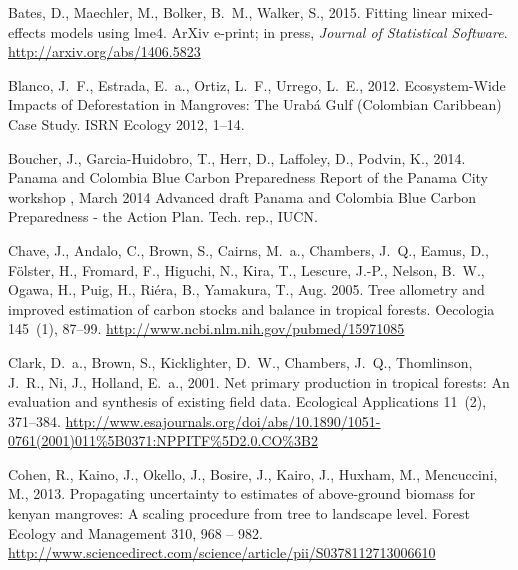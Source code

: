 \documentclass[review, authoryear]{elsarticle}   	%
\begin{document}
\begin{thebibliography}{51}
Bates, D., Maechler, M., Bolker, B.~M., Walker, S., 2015. Fitting linear
  mixed-effects models using {lme4}. ArXiv e-print; in press, \emph{Journal of
  Statistical Software}.
\newline\urlprefix\url{http://arxiv.org/abs/1406.5823}

Blanco, J.~F., Estrada, E.~a., Ortiz, L.~F., Urrego, L.~E., 2012.
  {Ecosystem-Wide Impacts of Deforestation in Mangroves: The Urab\'{a} Gulf
  (Colombian Caribbean) Case Study}. ISRN Ecology 2012, 1--14.

Boucher, J., Garcia-Huidobro, T., Herr, D., Laffoley, D., Podvin, K., 2014.
  {Panama and Colombia Blue Carbon Preparedness Report of the Panama City
  workshop , March 2014 Advanced draft Panama and Colombia Blue Carbon
  Preparedness - the Action Plan}. Tech. rep., IUCN.

Chave, J., Andalo, C., Brown, S., Cairns, M.~a., Chambers, J.~Q., Eamus, D.,
  F\"{o}lster, H., Fromard, F., Higuchi, N., Kira, T., Lescure, J.-P., Nelson,
  B.~W., Ogawa, H., Puig, H., Ri\'{e}ra, B., Yamakura, T., Aug. 2005. {Tree
  allometry and improved estimation of carbon stocks and balance in tropical
  forests.} Oecologia 145~(1), 87--99.
\newline\urlprefix\url{http://www.ncbi.nlm.nih.gov/pubmed/15971085}

Clark, D.~a., Brown, S., Kicklighter, D.~W., Chambers, J.~Q., Thomlinson,
  J.~R., Ni, J., Holland, E.~a., 2001. {Net primary production in tropical
  forests: An evaluation and synthesis of existing field data}. Ecological
  Applications 11~(2), 371--384.
\newline\urlprefix\url{http://www.esajournals.org/doi/abs/10.1890/1051-0761(2001)011\%5B0371:NPPITF\%5D2.0.CO\%3B2}

Cohen, R., Kaino, J., Okello, J., Bosire, J., Kairo, J., Huxham, M.,
  Mencuccini, M., 2013. Propagating uncertainty to estimates of above-ground
  biomass for kenyan mangroves: A scaling procedure from tree to landscape
  level. Forest Ecology and Management 310, 968 -- 982.
\newline\urlprefix\url{http://www.sciencedirect.com/science/article/pii/S0378112713006610}


\end{thebibliography}
\end{document}
